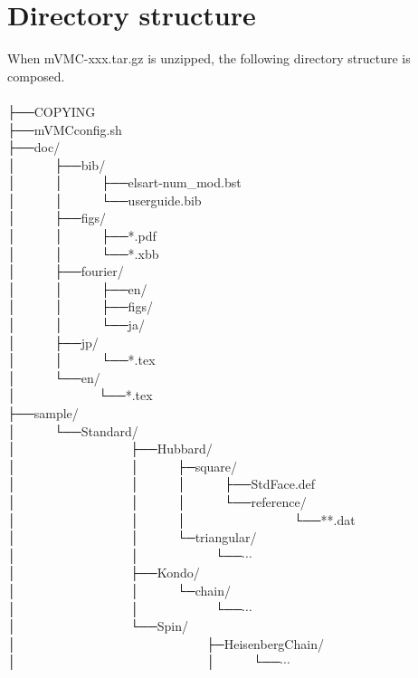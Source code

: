 \section{Directory structure}
When mVMC-xxx.tar.gz is unzipped, the following directory structure is composed.\\
\\
├──COPYING\\
├──mVMCconfig.sh\\
├──doc/\\
│~~~~~~├──bib/\\
│~~~~~~│~~~~~~├──elsart-num\_mod.bst\\
│~~~~~~│~~~~~~└──userguide.bib\\
│~~~~~~├──figs/\\
│~~~~~~│~~~~~~├──*.pdf\\
│~~~~~~│~~~~~~└──*.xbb\\
│~~~~~~├──fourier/\\
│~~~~~~│~~~~~~├──en/\\
│~~~~~~│~~~~~~├──figs/\\
│~~~~~~│~~~~~~└──ja/\\
│~~~~~~├──jp/\\
│~~~~~~│~~~~~~└──*.tex\\
│~~~~~~└──en/\\
│~~~~~~~~~~~~~└──*.tex\\
├──sample/\\
│~~~~~~└──Standard/\\
│~~~~~~~~~~~~~~~~~~├──Hubbard/\\
│~~~~~~~~~~~~~~~~~~│~~~~~~├─square/\\
│~~~~~~~~~~~~~~~~~~│~~~~~~│~~~~~~├──StdFace.def\\
│~~~~~~~~~~~~~~~~~~│~~~~~~│~~~~~~└──reference/\\
│~~~~~~~~~~~~~~~~~~│~~~~~~│~~~~~~~~~~~~~~~~~└──**.dat\\
│~~~~~~~~~~~~~~~~~~│~~~~~~└─triangular/\\
│~~~~~~~~~~~~~~~~~~│~~~~~~~~~~~~└──$\cdots$\\
│~~~~~~~~~~~~~~~~~~├──Kondo/\\
│~~~~~~~~~~~~~~~~~~│~~~~~~└─chain/\\
│~~~~~~~~~~~~~~~~~~│~~~~~~~~~~~~└──$\cdots$\\
│~~~~~~~~~~~~~~~~~~└──Spin/\\
│~~~~~~~~~~~~~~~~~~~~~~~~~~~~~~├─HeisenbergChain/\\
│~~~~~~~~~~~~~~~~~~~~~~~~~~~~~~│~~~~~~└──$\cdots$\\
